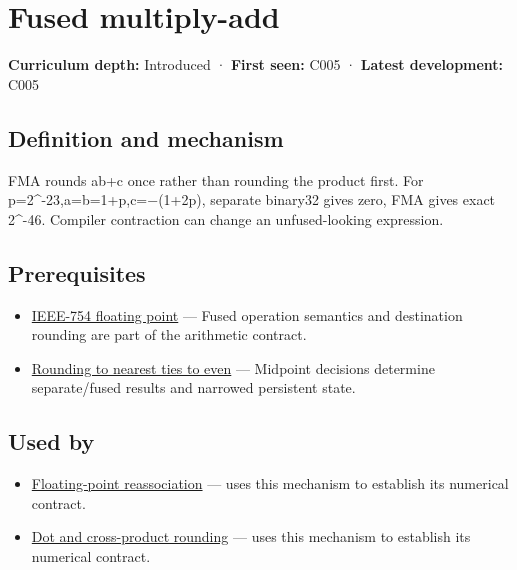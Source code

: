 \hypertarget{appendix-41e8ef22a21e}{}
\section{Fused multiply-add}\label{appendix-41e8ef22a21e-fused-multiply-add}

\textbf{Curriculum depth:} Introduced · \textbf{First seen:} C005 · \textbf{Latest development:} C005

\subsection{Definition and mechanism}\label{appendix-41e8ef22a21e-definition-and-mechanism}

FMA rounds ab+c once rather than rounding the product first. For p=2\^{}-23,a=b=1+p,c=−(1+2p), separate binary32 gives zero, FMA gives exact 2\^{}-46. Compiler contraction can change an unfused-looking expression.

\subsection{Prerequisites}\label{appendix-41e8ef22a21e-prerequisites}

\begin{itemize}
\tightlist
\item
  \hyperref[appendix-343615f49ddf]{IEEE-754 floating point} --- Fused operation semantics and destination rounding are part of the arithmetic contract.
\item
  \hyperref[appendix-614afe1de592]{Rounding to nearest ties to even} --- Midpoint decisions determine separate/fused results and narrowed persistent state.
\end{itemize}

\subsection{Used by}\label{appendix-41e8ef22a21e-used-by}

\begin{itemize}
\tightlist
\item
  \hyperref[appendix-c2ac4a84c283]{Floating-point reassociation} --- uses this mechanism to establish its numerical contract.
\item
  \hyperref[appendix-5aef4f13483a]{Dot and cross-product rounding} --- uses this mechanism to establish its numerical contract.
\end{itemize}

